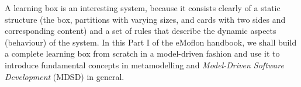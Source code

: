 A learning box is an interesting system, because it consists clearly of a static structure (the box, partitions with varying sizes, and cards with two sides and
corresponding content) and a set of rules that describe the dynamic aspects (behaviour) of the system. In this Part I of the eMoflon handbook, we shall build a 
complete learning box from scratch in a model-driven fashion and use it to introduce fundamental concepts in metamodelling and \emph{Model-Driven Software 
Development} (MDSD) in general.

